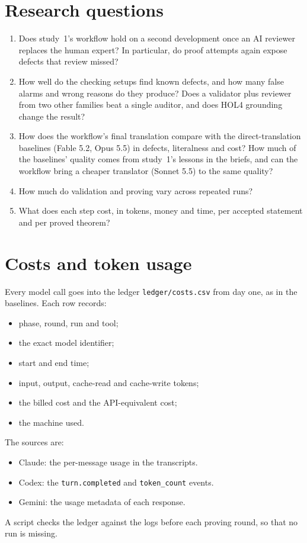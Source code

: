 \documentclass[11pt,a4paper]{article}
\newcommand{\code}[1]{\texttt{#1}}
\begin{document}
\section{Research questions}
\begin{enumerate}[label=RQ\arabic*.]
\item Does study~1's workflow hold on a second development once an AI reviewer replaces the human expert? In particular, do proof attempts again expose defects that review missed?
\item How well do the checking setups find known defects, and how many false alarms and wrong reasons do they produce? Does a validator plus reviewer from two other families beat a single auditor, and does HOL4 grounding change the result?
\item How does the workflow's final translation compare with the direct-translation baselines (Fable 5.2, Opus 5.5) in defects, literalness and cost? How much of the baselines' quality comes from study~1's lessons in the briefs, and can the workflow bring a cheaper translator (Sonnet 5.5) to the same quality?
\item How much do validation and proving vary across repeated runs?
\item What does each step cost, in tokens, money and time, per accepted statement and per proved theorem?
\end{enumerate}

\section{Costs and token usage}
Every model call goes into the ledger \code{ledger/costs.csv} from day one, as in the baselines. Each row records:
\begin{itemize}
\item phase, round, run and tool;
\item the exact model identifier;
\item start and end time;
\item input, output, cache-read and cache-write tokens;
\item the billed cost and the API-equivalent cost;
\item the machine used.
\end{itemize}
The sources are:
\begin{itemize}
\item Claude: the per-message usage in the transcripts.
\item Codex: the \code{turn.completed} and \code{token\_count} events.
\item Gemini: the usage metadata of each response.
\end{itemize}
A script checks the ledger against the logs before each proving round, so that no run is missing.
\end{document}
